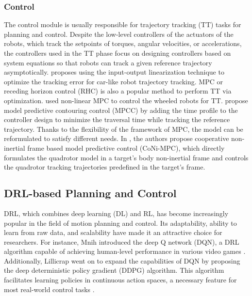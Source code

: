 \documentclass[letterpaper,journal,twoside]{IEEEtran}
\begin{document}
\subsubsection{Control}
The control module is usually responsible for trajectory 
tracking (TT) tasks for planning and control.
Despite the low-level controllers of the actuators of the 
robots, which track the setpoints of torques, angular 
velocities, or accelerations, the controllers used in the TT
phase focus on designing controllers based on system
equations so that robots can track a given reference 
trajectory asymptotically. 
\cite{majd2019stable} proposes using the input-output 
linearization technique to optimize the tracking error for
car-like robot trajectory tracking.
MPC or receding horizon control (RHC)
is also a popular method to perform TT via optimization.
\cite{kunhe2005mobile} used non-linear MPC to control the 
wheeled robots for TT.
\cite{romero2022model,ji2021cmpcc} propose model predictive
contouring control (MPCC) by adding the time profile to the 
controller design to minimize the traversal time while tracking
the reference trajectory.
Thanks to the flexibility of the framework of MPC, the model 
can be reformulated to satisfy different needs. 
In \cite{zhang2023coni}, the authors propose cooperative 
non-inertial frame based model predictive control (CoNi-MPC), 
which directly formulates the quadrotor model in a target's 
body non-inertial frame and controls the quadrotor tracking 
trajectories predefined in the target's frame.

\subsection{DRL-based Planning and Control}
DRL, which combines deep learning (DL) and RL, 
has become increasingly popular in the field of motion planning 
and control. 
Its adaptability, ability to learn from raw data, and scalability 
have made it an attractive choice for researchers.
For instance, Mnih \etal introduced the deep Q network (DQN), 
a DRL algorithm capable of achieving human-level performance in various video games \cite{mnih2015human}. 
Additionally, Lillicrap \etal went on to expand the 
capabilities of DQN by proposing the deep deterministic policy 
gradient (DDPG) algorithm. 
This algorithm facilitates learning policies in continuous action 
spaces, a necessary feature for most real-world control tasks 
\cite{lillicrap2015continuous}.
\end{document}
